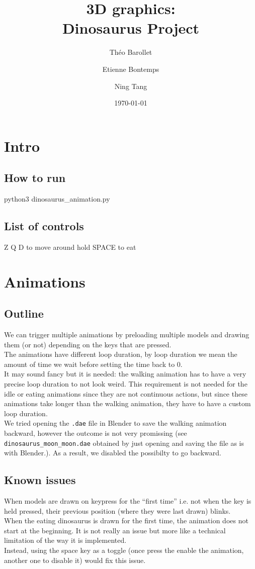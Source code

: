 \documentclass[11pt]{article}
\title{\textbf{3D graphics:}\\ Dinosaurus Project}
\date{\today}
\author{Théo Barollet \and Etienne Bontemps \and Ning Tang}
\begin{document}
\maketitle
\section{Intro}
\subsection*{How to run}
python3 dinosaurus_animation.py

\subsection*{List of controls}
Z Q D to move around
hold SPACE to eat

\section{Animations}
\subsection*{Outline}
\noindent We can trigger multiple animations by preloading multiple models and drawing them (or not) depending on the keys that are pressed.\\
The animations have different loop duration, by loop duration we mean the amount of time we wait before setting the time back to 0.\\
It may sound fancy but it is needed: the walking animation has to have a very precise loop duration to not look weird. This requirement is not needed for the idle or eating animations since they are not continuous actions, but since these animations take longer than the walking animation, they have to have a custom loop duration.\\
We tried opening the \texttt{.dae} file in Blender to save the walking animation backward, however the outcome is not very promissing (see \texttt{dinosaurus\_moon\_moon.dae} obtained by just opening and saving the file as is with Blender.). As a result, we disabled the possibilty to go backward.\\

\subsection*{Known issues}
\noindent When models are drawn on keypress for the ``first time'' i.e. not when the key is held pressed, their previous position (where they were last drawn) blinks.\\
When the eating dinosaurus is drawn for the first time, the animation does not start at the beginning. It is not really an issue but more like a technical limitation of the way it is implemented.\\
Instead, using the space key as a toggle (once press the enable the animation, another one to disable it) would fix this issue.
\end{document}

